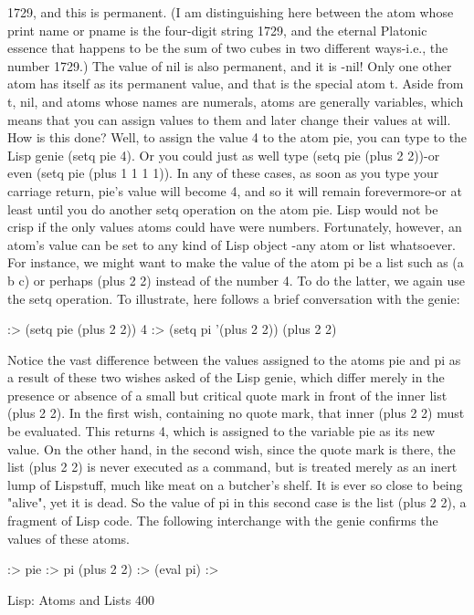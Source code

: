 1729, and this is permanent. (I am distinguishing here between the atom whose print
name or pname is the four-digit string 1729, and the eternal Platonic essence that
happens to be the sum of two cubes in two different ways-i.e., the number 1729.) The
value of nil is also permanent, and it is -nil! Only one other atom has itself as its
permanent value, and that is the special atom t.
        Aside from t, nil, and atoms whose names are numerals, atoms are generally
variables, which means that you can assign values to them and later change their
values at will. How is this done? Well, to assign the value 4 to the atom pie, you can
type to the Lisp genie (setq pie 4). Or you could just as well type (setq pie (plus 2
2))-or even (setq pie (plus 1 1 1 1)). In any of these cases, as soon as you type your
carriage return, pie's value will become 4, and so it will remain forevermore-or at
least until you do another setq operation on the atom pie.
        Lisp would not be crisp if the only values atoms could have were numbers.
Fortunately, however, an atom's value can be set to any kind of Lisp object -any atom
or list whatsoever. For instance, we might want to make the value of the atom pi be a
list such as (a b c) or perhaps (plus 2 2) instead of the number 4. To do the latter, we
again use the setq operation. To illustrate, here follows a brief conversation with the
genie:

       :> (setq pie (plus 2 2)) 4
       :> (setq pi '(plus 2 2)) (plus 2 2)

         Notice the vast difference between the values assigned to the atoms pie and pi
as a result of these two wishes asked of the Lisp genie, which differ merely in the
presence or absence of a small but critical quote mark in front of the inner list (plus 2
2). In the first wish, containing no quote mark, that inner (plus 2 2) must be evaluated.
This returns 4, which is assigned to the variable pie as its new value. On the other
hand, in the second wish, since the quote mark is there, the list (plus 2 2) is never
executed as a command, but is treated merely as an inert lump of Lispstuff, much like
meat on a butcher's shelf. It is ever so close to being "alive", yet it is dead. So the
value of pi in this second case is the list (plus 2 2), a fragment of Lisp code. The
following interchange with the genie confirms the values of these atoms.

:> pie
:> pi
(plus 2 2)
:> (eval pi)
:>




Lisp: Atoms and Lists                                                                400

